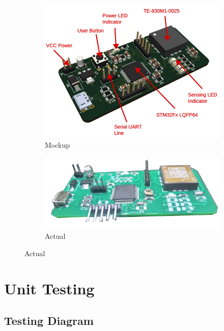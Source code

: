 \documentclass[a4paper,12pt,oneside,pdflatex,italian,final,twocolumn]{article}
\begin{document}
	\begin{figure}[h]
		\centering
		\begin{subfigure}{0.45\textwidth}
			\includegraphics[width=\textwidth]{images/vibparts.png}
			\caption{Mockup}
		\end{subfigure}
		\begin{subfigure}{0.45\textwidth}
			\includegraphics[width=\textwidth]{images/vibs.png}
			\caption{Actual}
		\end{subfigure}
	\end{figure}

	\section{Unit Testing}

	\subsection{Testing Diagram}
\end{document}
